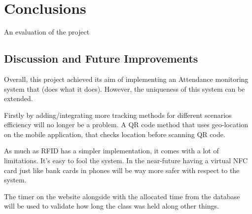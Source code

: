 \chapter{Conclusions}
An evaluation of the project

\section{Discussion and Future Improvements}

Overall, this project achieved its aim of implementing an Attendance monitoring system that (does what it does). However, the uniqueness of this system can be extended.

Firstly by adding/integrating more tracking methods for different scenarios efficiency will no longer be a problem.
A QR code method that uses geo-location on the mobile application, that checks location before scanning QR code.

As much as RFID has a simpler implementation, it comes with a lot of limitations. It's easy to fool the system. In the near-future having a virtual NFC card just like bank cards in phones will be way more safer with respect to the system.

The timer on the website alongside with the allocated time from the database will be used to validate how long the class was held along other things.
